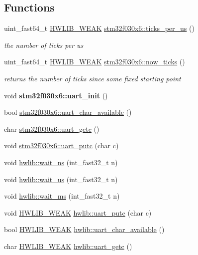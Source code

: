 \subsection*{Functions}
\begin{DoxyCompactItemize}
\item 
uint\+\_\+fast64\+\_\+t \hyperlink{hwlib-defines_8hpp_a04be4340016df60d6636c1d1c6d94fc9}{H\+W\+L\+I\+B\+\_\+\+W\+E\+AK} \hyperlink{namespacestm32f030x6_a27427bc351a5ba91ea69a3be5d1b27de}{stm32f030x6\+::ticks\+\_\+per\+\_\+us} ()
\begin{DoxyCompactList}\small\item\em the number of ticks per us \end{DoxyCompactList}\item 
uint\+\_\+fast64\+\_\+t \hyperlink{hwlib-defines_8hpp_a04be4340016df60d6636c1d1c6d94fc9}{H\+W\+L\+I\+B\+\_\+\+W\+E\+AK} \hyperlink{namespacestm32f030x6_ae284e9d77fe0c507568353cc5f0129f6}{stm32f030x6\+::now\+\_\+ticks} ()
\begin{DoxyCompactList}\small\item\em returns the number of ticks since some fixed starting point \end{DoxyCompactList}\item 
\mbox{\label{namespacestm32f030x6_a8729318a90dba3e0070f88afcb9d4d61}} 
void {\bfseries stm32f030x6\+::uart\+\_\+init} ()
\item 
bool \hyperlink{namespacestm32f030x6_a6d4aa0ce390d76e08a757100ddc0c7e8}{stm32f030x6\+::uart\+\_\+char\+\_\+available} ()
\item 
char \hyperlink{namespacestm32f030x6_ae4ffd99ebca764be1c506dbebb59eb07}{stm32f030x6\+::uart\+\_\+getc} ()
\item 
void \hyperlink{namespacestm32f030x6_ac4348e3318c69d76563ecfde8655d833}{stm32f030x6\+::uart\+\_\+putc} (char c)
\item 
void \hyperlink{namespacehwlib_a9c01a1d0319f5eadd8926e66aea19aa0}{hwlib\+::wait\+\_\+ns} (int\+\_\+fast32\+\_\+t n)
\item 
void \hyperlink{namespacehwlib_a0096b739fc566c896366ecbd3113cc1e}{hwlib\+::wait\+\_\+us} (int\+\_\+fast32\+\_\+t n)
\item 
void \hyperlink{namespacehwlib_a6119aa5d3034176aa1515ef4bb193044}{hwlib\+::wait\+\_\+ms} (int\+\_\+fast32\+\_\+t n)
\item 
void \hyperlink{hwlib-defines_8hpp_a04be4340016df60d6636c1d1c6d94fc9}{H\+W\+L\+I\+B\+\_\+\+W\+E\+AK} \hyperlink{namespacehwlib_ae568ebef4b8d8a77cecae8cea595896f}{hwlib\+::uart\+\_\+putc} (char c)
\item 
bool \hyperlink{hwlib-defines_8hpp_a04be4340016df60d6636c1d1c6d94fc9}{H\+W\+L\+I\+B\+\_\+\+W\+E\+AK} \hyperlink{namespacehwlib_aaf31868f62815d2e405ad90469ae50a5}{hwlib\+::uart\+\_\+char\+\_\+available} ()
\item 
char \hyperlink{hwlib-defines_8hpp_a04be4340016df60d6636c1d1c6d94fc9}{H\+W\+L\+I\+B\+\_\+\+W\+E\+AK} \hyperlink{namespacehwlib_aa5ee60a7ff11cc49aba41f8be7f08a67}{hwlib\+::uart\+\_\+getc} ()
\end{DoxyCompactItemize}
